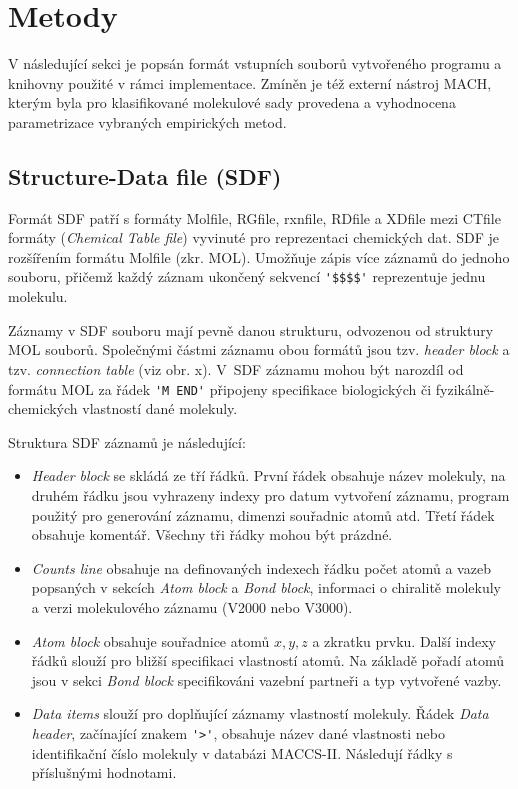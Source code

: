 \chapter{Metody}
V následující sekci je popsán formát vstupních souborů vytvořeného programu a kni\-hov\-ny použité v rámci implementace. Zmíněn je  též externí nástroj MACH, kterým byla pro klasifikované molekulové sady provedena a vyhodnocena parametrizace vybraných empirických metod. 

\section{Structure-Data file (SDF)}
Formát SDF \cite{sdf_pdf, sdf_clanek} patří s formáty Molfile, RGfile, rxnfile, RDfile a XDfile mezi CTfile formáty (\textit{Chemical Table file})  vyvinuté pro reprezentaci chemických dat. SDF je rozšířením formátu Molfile (zkr. MOL). 
Umožňuje zápis více záznamů do jednoho souboru, přičemž každý záznam ukončený sekvencí \verb|'$$$$'| reprezentuje jednu molekulu. 

Záznamy v SDF souboru mají pevně danou strukturu, odvozenou od struktury MOL souborů. Společnými  částmi záznamu obou formátů jsou tzv. \textit{header block} a tzv. \textit{connection table} (viz obr. x). %
V~SDF záznamu mohou být narozdíl od formátu MOL za řádek \verb|'M END'| připojeny specifikace biologických či fyzikálně-che\-mic\-kých vlastností dané molekuly. 

Struktura SDF záznamů je následující:
\begin{itemize}
    \item \textit{Header block} se skládá ze tří řádků. První řádek obsahuje název molekuly, na druhém řádku jsou vyhrazeny indexy pro datum vytvoření záznamu, program použitý pro generování záznamu, dimenzi souřadnic atomů atd. Třetí řádek obsahuje komentář. Všechny tři řádky mohou být prázdné.
    \item \textit{Counts line} obsahuje na definovaných indexech řádku počet atomů a vazeb  popsaných v sekcích \textit{Atom block} a \textit{Bond block}, informaci o chiralitě molekuly a verzi molekulového záznamu (V2000 nebo V3000).
    \item \textit{Atom block} obsahuje souřadnice atomů  $x, y, z$ a zkratku prvku. Další indexy řádků slouží pro bližší specifikaci vlastností atomů. Na základě pořadí atomů jsou v sekci \textit{Bond block} specifikováni vazební partneři a typ vytvořené vazby. 
    \item \textit{Data items} slouží pro doplňující záznamy vlastností molekuly. Řádek \textit{Data header}, začínající znakem \verb|'>'|, obsahuje název dané vlastnosti nebo identifikační číslo molekuly v databázi MACCS-II. Následují řádky s příslušnými hodnotami.
\end{itemize}

